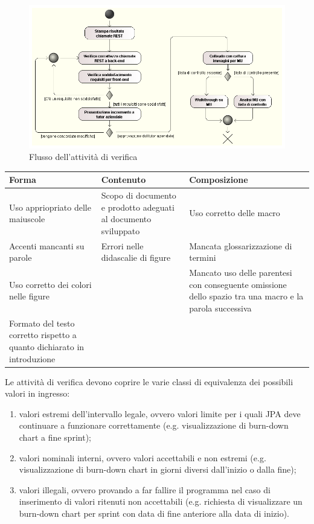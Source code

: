 \begin{figure}[H]%
\centering
\includegraphics[width=1.2\columnwidth]{immagini/verification-flow}
\caption{Flusso dell'attività di verifica}
\label{fig:flow-verification}%
\end{figure}

\begin{tabular}{ | p{4cm} | p{4cm} | p{4cm} | }

\hline
\textbf{Forma} & \textbf{Contenuto} & \textbf{Composizione} \\
\hline
Uso appriopriato delle maiuscole &
Scopo di documento e prodotto adeguati al documento sviluppato &
Uso corretto delle macro  \\
\hline
Accenti mancanti su parole &
Errori nelle didascalie di figure &
Mancata glossarizzazione di termini \\
\hline
Uso corretto dei colori nelle figure &
&
Mancato uso delle parentesi con conseguente omissione dello spazio tra una
macro e la parola successiva \\
\hline
Formato del testo corretto rispetto a quanto dichiarato in introduzione &
&
 \\
\hline
\end{tabular}
\label{tab:inspection}

Le attività di verifica devono coprire le varie classi di equivalenza dei
possibili valori in ingresso:

\begin{enumerate}
\item valori estremi dell'intervallo legale, ovvero valori limite per i quali
  JPA deve continuare a funzionare correttamente (e.g. visualizzazione di
  burn-down chart a fine sprint);
\item valori nominali interni, ovvero valori accettabili e non estremi (e.g.
  visualizzazione di burn-down chart in giorni diversi dall'inizio o dalla
  fine);
\item valori illegali, ovvero provando a far fallire il programma nel caso di
  inserimento di valori ritenuti non accettabili (e.g. richiesta di
  visualizzare un burn-down chart per sprint con data di fine anteriore alla
  data di inizio).
\end{enumerate}

